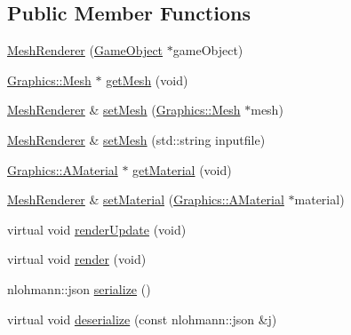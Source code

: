 \subsection*{Public Member Functions}
\begin{DoxyCompactItemize}
\item 
\mbox{\hyperlink{class_beer_engine_1_1_component_1_1_mesh_renderer_a9597f09757bac34c6f5c00d4cb18add3}{Mesh\+Renderer}} (\mbox{\hyperlink{class_beer_engine_1_1_game_object}{Game\+Object}} $\ast$game\+Object)
\item 
\mbox{\hyperlink{class_beer_engine_1_1_graphics_1_1_mesh}{Graphics\+::\+Mesh}} $\ast$ \mbox{\hyperlink{class_beer_engine_1_1_component_1_1_mesh_renderer_ac819f6d8c1791174fa7b9f060a8b8204}{get\+Mesh}} (void)
\item 
\mbox{\hyperlink{class_beer_engine_1_1_component_1_1_mesh_renderer}{Mesh\+Renderer}} \& \mbox{\hyperlink{class_beer_engine_1_1_component_1_1_mesh_renderer_a818276a7fe8703a04bf431a41fa4c907}{set\+Mesh}} (\mbox{\hyperlink{class_beer_engine_1_1_graphics_1_1_mesh}{Graphics\+::\+Mesh}} $\ast$mesh)
\item 
\mbox{\hyperlink{class_beer_engine_1_1_component_1_1_mesh_renderer}{Mesh\+Renderer}} \& \mbox{\hyperlink{class_beer_engine_1_1_component_1_1_mesh_renderer_a0bc2f51937864cfb8a470cd9a19321e6}{set\+Mesh}} (std\+::string inputfile)
\item 
\mbox{\hyperlink{class_beer_engine_1_1_graphics_1_1_a_material}{Graphics\+::\+A\+Material}} $\ast$ \mbox{\hyperlink{class_beer_engine_1_1_component_1_1_mesh_renderer_ae3ce0ffa128f92e36e9c09fc6349ddf6}{get\+Material}} (void)
\item 
\mbox{\hyperlink{class_beer_engine_1_1_component_1_1_mesh_renderer}{Mesh\+Renderer}} \& \mbox{\hyperlink{class_beer_engine_1_1_component_1_1_mesh_renderer_a9d4408a8c5e670c130394c59eeb5ccf2}{set\+Material}} (\mbox{\hyperlink{class_beer_engine_1_1_graphics_1_1_a_material}{Graphics\+::\+A\+Material}} $\ast$material)
\item 
virtual void \mbox{\hyperlink{class_beer_engine_1_1_component_1_1_mesh_renderer_abca4caa865363fdccb1b0c6fc6f7c81d}{render\+Update}} (void)
\item 
virtual void \mbox{\hyperlink{class_beer_engine_1_1_component_1_1_mesh_renderer_ace87e6038f061bf1815f047f4bc0c6e8}{render}} (void)
\item 
nlohmann\+::json \mbox{\hyperlink{class_beer_engine_1_1_component_1_1_mesh_renderer_a65c6c22ae40b5b94f590c3a8bf14d0d0}{serialize}} ()
\item 
virtual void \mbox{\hyperlink{class_beer_engine_1_1_component_1_1_mesh_renderer_a19b2d1dd25274ea7af898af2bc305a7b}{deserialize}} (const nlohmann\+::json \&j)
\end{DoxyCompactItemize}
